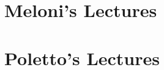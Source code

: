 \documentclass[11pt, a4paper, twoside, openright]{book}
\begin{document}
%
%
%
%
%
%






\mainmatter
\pagestyle{fancy}

\part{Meloni's Lectures}



 
 
 
 



\part{Poletto's Lectures}

\backmatter
\pagestyle{plain}



\end{document}
